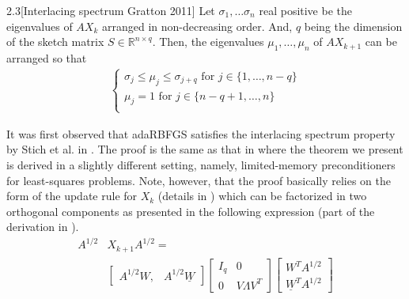 \documentclass[12pt,conference,compsocconf]{IEEEtran}
\newcommand{\R}{\mathbb{R}}
\begin{document}
\begin{customthm}{2.3}[Interlacing spectrum Gratton 2011]\label{thm:interlacing}
Let $\sigma_1,\ldots\sigma_n$ real positive be the eigenvalues of $AX_{k}$ arranged in non-decreasing order. And, $q$ being the dimension of the sketch matrix $S \in \R^{n\times q}$. Then, the eigenvalues $\mu_1,\ldots,\mu_n$ of $AX_{k+1}$ can be arranged so that\\
\vspace{0mm}
\begin{align}\label{eq:interlacing}
	\left\{
    	\begin{array}{ll}
        	\sigma_j\leq\mu_j\leq\sigma_{j+q}\text{  for } j \in \{1,\ldots,n-q\}\\ 
            \mu_j=1 \text{                           for } j \in\{n-q+1,\ldots,n\}\\
        \end{array}                 
    \right.
\end{align}

\end{customthm}
\vspace{0mm}
It was first observed that adaRBFGS satisfies the interlacing spectrum property by Stich et al. in \cite{Stich1}. The proof is the same as that in \cite{Gratton} where the theorem we present is derived in a slightly different setting, namely, limited-memory preconditioners for least-squares problems. Note, however, that the proof basically relies on the form of the update rule for $X_k$ (details in \cite{Gratton}) which can be factorized in two orthogonal components as presented in the following expression (part of the derivation in \cite{Gratton}).
\vspace{-7mm}
\begin{align}\label{eq:compression}
		A^{1/2}&X_{k+1}A^{1/2}
    	=\\ \nonumber
    	&\begin{bmatrix}
    		A^{1/2}W, & A^{1/2}\underline{W}
    	\end{bmatrix}
        \begin{bmatrix}
			I_q & 0\\
    		0 & V\Lambda V^T
		\end{bmatrix}
    	\begin{bmatrix}
    		W^TA^{1/2}\\
        	\underline{W}^TA^{1/2}
    	  \end{bmatrix} \nonumber
\end{align}
\vspace{-5mm}
\end{document}
